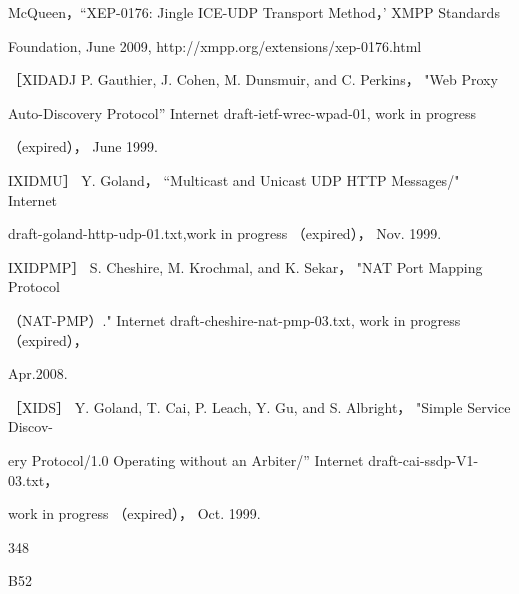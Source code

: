 McQueen，“XEP-0176: Jingle ICE-UDP Transport Method，' XMPP Standards

Foundation, June 2009, http://xmpp.org/extensions/xep-0176.html

［XIDADJ P. Gauthier, J. Cohen, M. Dunsmuir, and C. Perkins， "Web Proxy

Auto-Discovery Protocol” Internet draft-ietf-wrec-wpad-01, work in progress

（expired）， June 1999.

IXIDMU］ Y. Goland， “Multicast and Unicast UDP HTTP Messages/" Internet

draft-goland-http-udp-01.txt,work in progress （expired）， Nov. 1999.

IXIDPMP］ S. Cheshire, M. Krochmal, and K. Sekar， "NAT Port Mapping Protocol

（NAT-PMP）." Internet draft-cheshire-nat-pmp-03.txt, work in progress （expired），

Apr.2008.

［XIDS］ Y. Goland, T. Cai, P. Leach, Y. Gu, and S. Albright， "Simple Service Discov-

ery Protocol/1.0 Operating without an Arbiter/” Internet draft-cai-ssdp-V1-03.txt，

work in progress （expired）， Oct. 1999.

348

B52